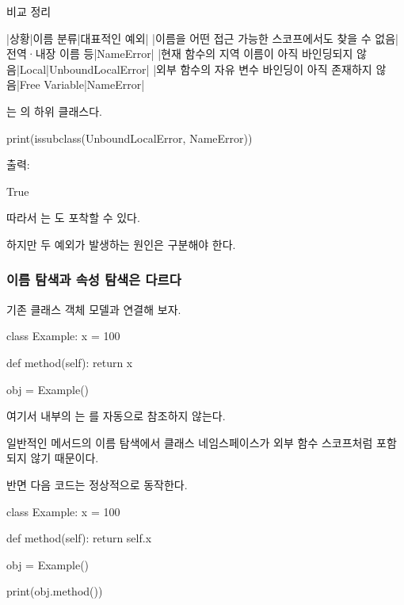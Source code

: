 \begin{dhknote}
\begin{dhksmry}[centered]
비교 정리
\end{dhksmry}
\end{dhknote}

\begin{dhktable}
|상황|이름 분류|대표적인 예외|
|이름을 어떤 접근 가능한 스코프에서도 찾을 수 없음|전역·내장 이름 등|NameError|
|현재 함수의 지역 이름이 아직 바인딩되지 않음|Local|UnboundLocalError|
|외부 함수의 자유 변수 바인딩이 아직 존재하지 않음|Free Variable|NameError|
\end{dhktable}

는 의 하위 클래스다.

\begin{dhkcode}
print(issubclass(UnboundLocalError, NameError))
\end{dhkcode}

출력:

\begin{dhkzsh}
True
\end{dhkzsh}

따라서 는 도 포착할 수 있다.

하지만 두 예외가 발생하는 원인은 구분해야 한다.

\subsubsection{이름 탐색과 속성 탐색은 다르다}

기존 클래스 객체 모델과 연결해 보자.

\begin{dhkcode}
class Example:
    x = 100

    def method(self):
        return x


obj = Example()
\end{dhkcode}

여기서  내부의 는 를 자동으로 참조하지 않는다.

일반적인 메서드의 이름 탐색에서 클래스 네임스페이스가 외부 함수 스코프처럼 포함되지 않기 때문이다.

반면 다음 코드는 정상적으로 동작한다.

\begin{dhkcode}
class Example:
    x = 100

    def method(self):
        return self.x


obj = Example()

print(obj.method())
\end{dhkcode}


